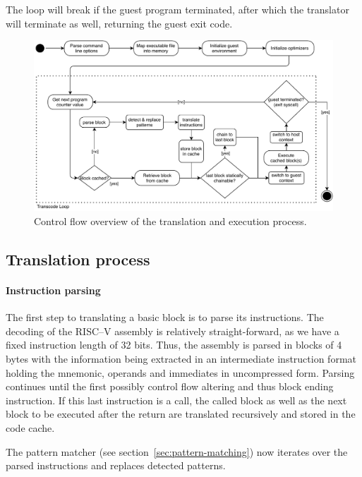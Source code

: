 The loop will break if the guest program terminated, after which the translator will terminate as well, returning the guest exit code.


\begin{figure}[h]
	\begin{center}
		\includegraphics[width=\textwidth]{media/strategy.pdf}
		\caption[Translator execution control flow]%
		{Control flow overview of the translation and execution process.}
		\label{fig:control-flow-chart}
	\end{center}
\end{figure}

\subsection{Translation process}
\paragraph{Instruction parsing} \mbox{}

The first step to translating a basic block is to parse its instructions.
The decoding of the RISC--V assembly is relatively straight-forward, as we have a fixed instruction length of 32 bits.
Thus, the assembly is parsed in blocks of 4 bytes with the information being extracted in an intermediate instruction format holding the mnemonic, operands and immediates in uncompressed form.
Parsing continues until the first possibly control flow altering and thus block ending instruction.
If this last instruction is a call, the called block as well as the next block to be executed after the return are translated recursively and stored in the code cache.

The pattern matcher (see section~\ref{sec:pattern-matching}) now iterates over the parsed instructions and replaces detected patterns.


